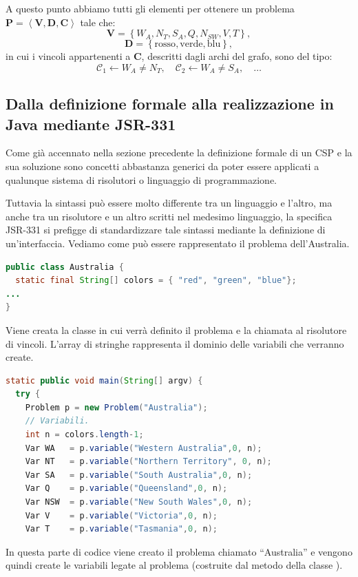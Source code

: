A questo punto abbiamo tutti gli elementi per ottenere un problema
$\mathbf{P} = \left\langle \mathbf{V}, \mathbf{D}, \mathbf{C}\right\rangle$
tale che:
\[
\mathbf{V} = \left\{ W_A, N_T, S_A, Q, N_{SW}, V, T \right\},
\]
\[
\mathbf{D} =  \left\{\textrm{rosso},\textrm{verde},\textrm{blu}\right\},
\]
in cui i vincoli appartenenti a $\mathbf{C}$, descritti dagli archi del grafo,
sono del tipo:
\[
\mathcal{C}_1 \leftarrow  W_A \neq N_T, \quad \mathcal{C}_2 \leftarrow  W_A
\neq S_A,\quad \ldots
\]

\subsection{Dalla definizione formale alla realizzazione in Java mediante
JSR-331}
Come già accennato nella sezione precedente la definizione formale di un
CSP e la sua soluzione sono concetti abbastanza generici da poter essere
applicati a qualunque sistema di risolutori o linguaggio di programmazione.

Tuttavia la sintassi può essere molto differente tra un linguaggio e l'altro, ma
anche tra un risolutore e un altro scritti nel medesimo linguaggio, la
specifica JSR-331 si prefigge di standardizzare tale sintassi mediante
la definizione di un'interfaccia. Vediamo come può essere rappresentato
il problema dell'Australia.

\begin{lstlisting}[language=Java,
                   caption = {\files{Australia.java}.}]
public class Australia {
  static final String[] colors = { "red", "green", "blue"};
...
}
\end{lstlisting}
Viene creata la classe  in cui verrà definito il problema
e la chiamata al risolutore di vincoli. L'array di stringhe rappresenta
il dominio delle variabili che verranno create.

\begin{lstlisting}[language=Java,
                   caption = {definizione delle variabili.},
                   frame = shadowbox]
static public void main(String[] argv) {
  try {
    Problem p = new Problem("Australia");
    // Variabili.
    int n = colors.length-1;
    Var WA   = p.variable("Western Australia",0, n);
    Var NT   = p.variable("Northern Territory", 0, n);
    Var SA   = p.variable("South Australia",0, n);
    Var Q    = p.variable("Queensland",0, n);
    Var NSW  = p.variable("New South Wales",0, n);
    Var V    = p.variable("Victoria",0, n);
    Var T    = p.variable("Tasmania",0, n);
\end{lstlisting}
In questa parte di codice viene creato il problema  chiamato
``Australia''
e vengono quindi create le variabili legate al problema (costruite dal
metodo  della classe ).

